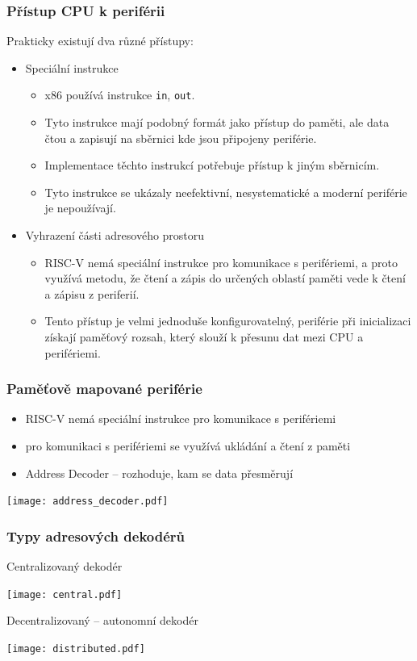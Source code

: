 \documentclass{beamer}
\begin{document}
\begin{frame}
\frametitle{Přístup CPU k periférii}

Prakticky existují dva různé přístupy:
\begin{itemize}
\item Speciální instrukce 
\begin{itemize}
\item x86 používá instrukce \texttt{in}, \texttt{out}.
\item Tyto instrukce mají podobný formát jako přístup do paměti, ale data čtou a zapisují na sběrnici kde jsou připojeny periférie.
\item Implementace těchto instrukcí potřebuje přístup k jiným sběrnicím.
\item Tyto instrukce se ukázaly neefektivní, nesystematické a moderní periférie je nepoužívají.
\end{itemize}
\item Vyhrazení části adresového prostoru
\begin{itemize}
\item RISC-V nemá speciální instrukce pro komunikace s perifériemi, a proto využívá metodu, že čtení a zápis do určených oblastí paměti vede k čtení a zápisu z periferií.
\item Tento přístup je velmi jednoduše konfigurovatelný, periférie při inicializaci získají paměťový rozsah, který slouží k přesunu dat mezi CPU a perifériemi.
\end{itemize}
\end{itemize}
\end{frame}


\begin{frame}
\frametitle{Paměťově mapované periférie}

\begin{itemize}
\item RISC-V nemá speciální instrukce pro komunikace s perifériemi
\item pro komunikaci s perifériemi se využívá ukládání a čtení z paměti
\item Address Decoder -- rozhoduje, kam se data přesměrují
\end{itemize}
\begin{center}
\texttt{[image: address\_decoder.pdf]}
\end{center}
\end{frame}


\begin{frame}
\frametitle{Typy adresových dekodérů}

Centralizovaný dekodér

\begin{center}
\texttt{[image: central.pdf]}
\end{center}

Decentralizovaný -- autonomní dekodér

\begin{center}
\texttt{[image: distributed.pdf]}
\end{center}
\end{frame}
\end{document}
